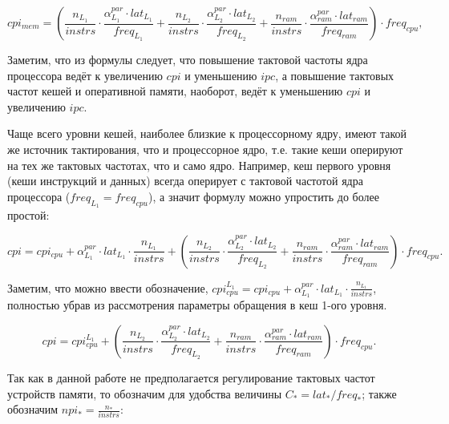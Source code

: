     \begin{equation}
        cpi_{mem} = \left( \frac{n_{L_1}}{instrs} \cdot \frac{\alpha_{L_1}^{par} \cdot lat_{L_1}}{freq_{L_1}} +
        \frac{n_{L_2}}{instrs} \cdot \frac{\alpha_{L_2}^{par} \cdot lat_{L_2}}{freq_{L_2}} +
        \frac{n_{ram}}{instrs} \cdot \frac{\alpha_{ram}^{par} \cdot lat_{ram}}{freq_{ram}} \right) \cdot freq_{cpu},
    \end{equation}

    Заметим, что из формулы следует, что повышение тактовой частоты ядра процессора ведёт к
    увеличению $cpi$ и уменьшению $ipc$, а повышение тактовых частот кешей и оперативной памяти,
    наоборот, ведёт к уменьшению $cpi$ и увеличению $ipc$.

    Чаще всего уровни кешей, наиболее близкие к процессорному ядру, имеют такой же источник
    тактирования, что и процессорное ядро, т.е. такие кеши оперируют на тех же тактовых частотах,
    что и само ядро. Например, кеш первого уровня (кеши инструкций и данных) всегда оперирует с
    тактовой частотой ядра процессора ($freq_{L_1} = freq_{cpu}$), а значит формулу можно упростить
    до более простой:

    \begin{equation}
        cpi = cpi_{cpu} + \alpha_{L_1}^{par} \cdot lat_{L_1} \cdot \frac{n_{L_1}}{instrs} +
        \left( \frac{n_{L_2}}{instrs} \cdot \frac{\alpha_{L_2}^{par} \cdot lat_{L_2}}{freq_{L_2}} +
        \frac{n_{ram}}{instrs} \cdot \frac{\alpha_{ram}^{par} \cdot lat_{ram}}{freq_{ram}} \right) \cdot freq_{cpu}.
    \end{equation}

    Заметим, что можно ввести обозначение,
    $cpi_{cpu}^{L_1} = cpi_{cpu} + \alpha_{L_1}^{par} \cdot lat_{L_1} \cdot \frac{n_{L_1}}{instrs}$,
    полностью убрав из рассмотрения параметры обращения в кеш 1-ого уровня.

    \begin{equation}
        cpi = cpi_{cpu}^{L_1} +
        \left( \frac{n_{L_2}}{instrs} \cdot \frac{\alpha_{L_2}^{par} \cdot lat_{L_2}}{freq_{L_2}} +
        \frac{n_{ram}}{instrs} \cdot \frac{\alpha_{ram}^{par} \cdot lat_{ram}}{freq_{ram}} \right) \cdot freq_{cpu}.
    \end{equation}

    Так как в данной работе не предполагается регулирование тактовых частот устройств памяти, то
    обозначим для удобства величины $C_{*} = lat_{*} / freq_{*}$; также обозначим
    $npi_{*} = \frac{n_{*}}{instrs}$:

